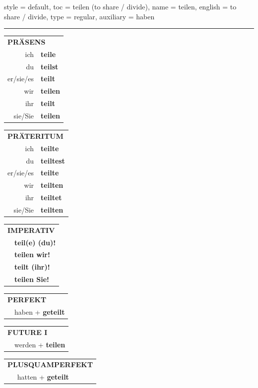 \begin{verbentry}{
  style = {default},
  toc = {teilen (to share / divide)},
  name = {teilen},
  english = {to share / divide},
  type = {regular},
  auxiliary = {haben}
}


\vspace{5pt}
\hrule
\vspace{5pt}

\begin{tabular}{rl}
\multicolumn{2}{l}{\textbf{PRÄSENS}}\\
ich & \textbf{teile}\\
du & \textbf{teilst}\\
er/sie/es & \textbf{teilt}\\
wir & \textbf{teilen}\\
ihr & \textbf{teilt}\\
sie/Sie & \textbf{teilen}\\
\end{tabular}
\hfill
\begin{tabular}{rl}
\multicolumn{2}{l}{\textbf{PRÄTERITUM}}\\
ich & \textbf{teilte}\\
du & \textbf{teiltest}\\
er/sie/es & \textbf{teilte}\\
wir & \textbf{teilten}\\
ihr & \textbf{teiltet}\\
sie/Sie & \textbf{teilten}\\
\end{tabular}
\hfill
\begin{tabular}{rl}
\multicolumn{2}{l}{\textbf{IMPERATIV}}\\
& \textbf{teil(e) (du)!}\\
& \textbf{teilen wir!}\\
& \textbf{teilt (ihr)!}\\
& \textbf{teilen Sie!}\\
\end{tabular}

\vspace{10pt}

\begin{tabular}{rl}
\multicolumn{2}{l}{\textbf{PERFEKT}}\\
& haben + \textbf{geteilt}\\
\end{tabular}
\hfill
\begin{tabular}{rl}
\multicolumn{2}{l}{\textbf{FUTURE I}}\\
& werden + \textbf{teilen}\\
\end{tabular}
\hfill
\begin{tabular}{rl}
\multicolumn{2}{l}{\textbf{PLUSQUAMPERFEKT}}\\
& hatten + \textbf{geteilt}\\
\end{tabular}


\end{verbentry}
